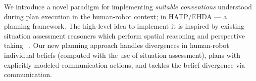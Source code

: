 \documentclass[letterpaper]{article} %
\begin{document}


We introduce a novel paradigm for implementing \textit{suitable conventions} understood during plan execution in the human-robot context; in HATP/EHDA --- a planning framework. The high-level idea to implement it is inspired by existing situation assessment reasoners which perform spatial reasoning and perspective taking ~\cite{flavell1992perspectives,trafton2005enabling,johnson2005perceptual,Sisbot2011SituationAF}. 
Our new planning approach 
handles divergences in human-robot individual beliefs (computed with the use of situation assessment), 
plans with explicitly modeled communication actions, and tackles the belief divergence 
via communication.

\end{document}
